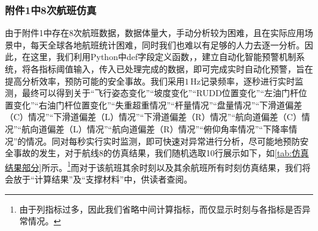 \documentclass{MathorCupModeling}
\begin{document}
\subsubsection{附件1中8次航班仿真}
由于附件1中存在8次航班数据，数据体量大，手动分析较为困难，且在实际应用场景中，每天全球各地航班统计困难，同时我们也难以有足够的人力去逐一分析。因此，在这里，我们利用Python中def字段定义函数，，建立自动化智能预警机制系统，将各指标阈值输入，传入已处理完成的数据，即可完成实时自动化预警，旨在提高分析效率，预防可能的安全事故。我们采用$1\,\text{Hz}$记录频率，逐秒进行实时监测，最终可以得到关于“飞行姿态变化”“坡度变化”“RUDD位置变化”“左油门杆位置变化”“右油门杆位置变化”“失重超重情况”“杆量情况”“盘量情况”“下滑道偏差（C）情况”“下滑道偏差（L）情况”“下滑道偏差（R）情况”“航向道偏差（C）情况”“航向道偏差（L）情况”“航向道偏差（R）情况”“俯仰角率情况”“下降率情况”的情况。同对每秒实行实时监测，即可快速对异常进行分析，尽可能地预防安全事故的发生，对于航线8的仿真结果，我们随机选取10行展示如下，如\textcolor{blue}{\cref{tab:仿真结果部分}}所示。\textcolor{blue}{\footnote{由于列指标过多，因此我们省略中间计算指标，而仅显示时刻与各指标是否异常情况。}}而对于该航班其余时刻以及其余航班所有时刻仿真结果，我们将会放于“计算结果”及“支撑材料”中，供读者查阅。
\end{document}
